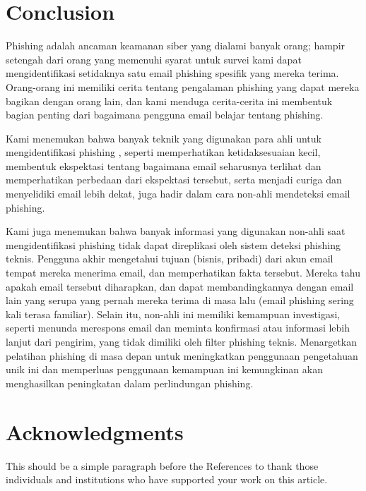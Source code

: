 \documentclass[lettersize,journal]{IEEEtran}
\begin{document}
\section{Conclusion}
Phishing adalah ancaman keamanan siber yang dialami banyak orang; hampir
setengah dari orang yang memenuhi syarat untuk survei kami dapat
mengidentifikasi setidaknya satu email phishing spesifik yang mereka terima.
Orang-orang ini memiliki cerita tentang pengalaman phishing yang dapat mereka
bagikan dengan orang lain, dan kami menduga cerita-cerita ini membentuk bagian
penting dari bagaimana pengguna email belajar tentang phishing.

Kami menemukan bahwa banyak teknik yang digunakan para ahli untuk
mengidentifikasi phishing \cite{tigaempat}, seperti memperhatikan
ketidaksesuaian kecil, membentuk ekspektasi tentang bagaimana email seharusnya
terlihat dan memperhatikan perbedaan dari ekspektasi tersebut, serta menjadi
curiga dan menyelidiki email lebih dekat, juga hadir dalam cara non-ahli
mendeteksi email phishing.

Kami juga menemukan bahwa banyak informasi yang digunakan non-ahli saat
mengidentifikasi phishing tidak dapat direplikasi oleh sistem deteksi phishing
teknis. Pengguna akhir mengetahui tujuan (bisnis, pribadi) dari akun email
tempat mereka menerima email, dan memperhatikan fakta tersebut. Mereka tahu
apakah email tersebut diharapkan, dan dapat membandingkannya dengan email lain
yang serupa yang pernah mereka terima di masa lalu (email phishing sering kali
terasa familiar). Selain itu, non-ahli ini memiliki kemampuan investigasi,
seperti menunda merespons email dan meminta konfirmasi atau informasi lebih
lanjut dari pengirim, yang tidak dimiliki oleh filter phishing teknis.
Menargetkan pelatihan phishing di masa depan untuk meningkatkan penggunaan
pengetahuan unik ini dan memperluas penggunaan kemampuan ini kemungkinan akan
menghasilkan peningkatan dalam perlindungan phishing.

\section*{Acknowledgments}
This should be a simple paragraph before the References to thank those individuals and institutions who have supported your work on this article.
\end{document}
